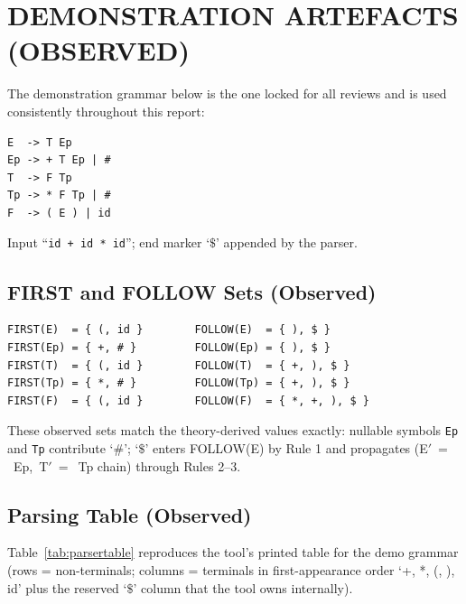 \documentclass[12pt,a4paper,oneside,openany]{report}
\newcommand{\code}[1]{\texttt{#1}}
\begin{document}
\section{DEMONSTRATION ARTEFACTS (OBSERVED)}
\label{sec:demoexpr}
The demonstration grammar below is the one locked for all reviews and is
used consistently throughout this report:
\begin{lstlisting}[style=cfg,label=lst:demogram,caption={The demonstration grammar}]
E  -> T Ep
Ep -> + T Ep | #
T  -> F Tp
Tp -> * F Tp | #
F  -> ( E ) | id
\end{lstlisting}
Input ``\code{id + id * id}''; end marker `$\$$' appended by the parser.

\subsection{FIRST and FOLLOW Sets (Observed)}
\begin{lstlisting}[style=outputcode,label=lst:sets,caption={FIRST and FOLLOW as printed by the tool}]
FIRST(E)  = { (, id }        FOLLOW(E)  = { ), $ }
FIRST(Ep) = { +, # }         FOLLOW(Ep) = { ), $ }
FIRST(T)  = { (, id }        FOLLOW(T)  = { +, ), $ }
FIRST(Tp) = { *, # }         FOLLOW(Tp) = { +, ), $ }
FIRST(F)  = { (, id }        FOLLOW(F)  = { *, +, ), $ }
\end{lstlisting}
These observed sets match the theory-derived values exactly: nullable
symbols \code{Ep} and \code{Tp} contribute `$\#$'; `$\$$' enters
FOLLOW(E) by Rule 1 and propagates (E$'~=$~Ep,~T$'~=$~Tp chain) through
Rules 2--3.

\subsection{Parsing Table (Observed)}
Table~\ref{tab:parsertable} reproduces the tool's printed table for the
demo grammar (rows = non-terminals; columns = terminals in
first-appearance order `+, *, (, ), id' plus the reserved `$\$$' column
that the tool owns internally).
\end{document}

